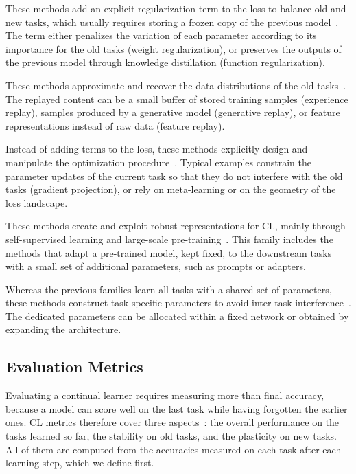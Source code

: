 These methods add an explicit regularization term to the loss to balance old and new tasks, which usually requires storing a frozen copy of the previous model~\cite{Wang2024tpami_cl}.
The term either penalizes the variation of each parameter according to its importance for the old tasks (weight regularization), or preserves the outputs of the previous model through knowledge distillation (function regularization).

These methods approximate and recover the data distributions of the old tasks~\cite{Wang2024tpami_cl}.
The replayed content can be a small buffer of stored training samples (experience replay), samples produced by a generative model (generative replay), or feature representations instead of raw data (feature replay).

Instead of adding terms to the loss, these methods explicitly design and manipulate the optimization procedure~\cite{Wang2024tpami_cl}.
Typical examples constrain the parameter updates of the current task so that they do not interfere with the old tasks (gradient projection), or rely on meta-learning or on the geometry of the loss landscape.

These methods create and exploit robust representations for CL, mainly through self-supervised learning and large-scale pre-training~\cite{Wang2024tpami_cl}.
This family includes the methods that adapt a pre-trained model, kept fixed, to the downstream tasks with a small set of additional parameters, such as prompts or adapters.

Whereas the previous families learn all tasks with a shared set of parameters, these methods construct task-specific parameters to avoid inter-task interference~\cite{Wang2024tpami_cl}.
The dedicated parameters can be allocated within a fixed network or obtained by expanding the architecture.

\subsection{Evaluation Metrics}
Evaluating a continual learner requires measuring more than final accuracy, because a model can score well on the last task while having forgotten the earlier ones.
CL metrics therefore cover three aspects~\cite{Wang2024tpami_cl}: the overall performance on the tasks learned so far, the stability on old tasks, and the plasticity on new tasks.
All of them are computed from the accuracies measured on each task after each learning step, which we define first.

